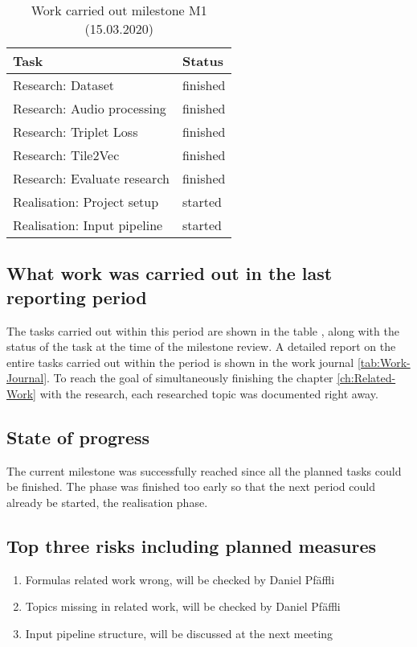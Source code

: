 \begin{table}[htbp]
    \centering
    \caption{Work carried out milestone M1 (15.03.2020)}
	\label{tab:Work-Carried-Out-M1}
    \begin{tabular}{p{} | p{}}
        \toprule
        \textbf{Task} & \textbf{Status} \\ 
        \midrule[1pt]
        Research: Dataset & finished \\
        \hline
        Research: Audio processing & finished \\
        \hline
        Research: Triplet Loss & finished \\
        \hline
        Research: Tile2Vec & finished \\
        \hline
        Research: Evaluate research & finished \\
        \hline
        Realisation: Project setup & started \\
        \hline
        Realisation: Input pipeline & started \\
        \bottomrule
    \end{tabular}
\end{table}

\subsection{What work was carried out in the last reporting period}
The tasks carried out within this period are shown in the table , along with the status of the task at the time of the milestone review. A detailed report on the entire tasks carried out within the period is shown in the work journal \ref{tab:Work-Journal}. To reach the goal of simultaneously finishing the chapter \ref{ch:Related-Work} with the research, each researched topic was documented right away. 
\subsection{State of progress}
The current milestone was successfully reached since all the planned tasks could be finished. The phase was finished too early so that the next period could already be started, the realisation phase. 

\subsection{Top three risks including planned measures}
\begin{enumerate}
    \setlength\itemsep{0em}
    \item Formulas related work wrong, will be checked by Daniel Pfäffli
    \item Topics missing in related work, will be checked by Daniel Pfäffli
    \item Input pipeline structure, will be discussed at the next meeting
\end{enumerate}

